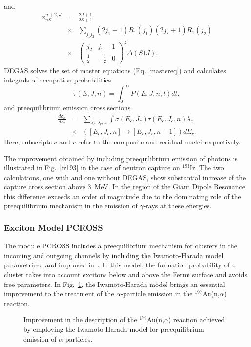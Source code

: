 \documentclass[twocolumn,amsmath,amssymb,10pt,groupedaddress,letter]{revtex4}
\begin{document}
and
\begin{eqnarray}
x_{nS}^{n+2,J}&=&\frac{2J+1}{2S+1}\nonumber\\
&\times&\sum_{j_{1}j_{2}}(2j_{1}+1)R_{1}(j_{1})(2j_{2}+1)R_{1}(j_{2})\nonumber\\
&\times&\left(\begin{array}{ccc}
j_{2} & j_{1} & 1\\
\frac{1}{2} & -\frac{1}{2} & 0\end{array}\right)^{2}\Delta(S1J).
\end{eqnarray}
DEGAS solves the set of master equations (Eq. \ref{mastereq})
and calculates integrals of occupation probabilities
\begin{equation}
\tau(E,J,n)=\int_{0}^{\infty}P(E,J,n,t)dt,
\end{equation}
and preequilibrium emission cross sections
\begin{eqnarray}
\frac{d\sigma_{x}}{d\varepsilon_{x}}&=&\sum_{J_{c},J_{r},n}\int\sigma(E_{c},J_{c})\tau(E_{c},J_{c},n)\lambda_{x}\nonumber\\
&\times&\left(\left[E_{c},J_{c},n\right]\rightarrow\left[E_{r},J_{r},n-1\right]\right)dE_{r}.
\end{eqnarray}
Here, subscripts $c$ and $r$ refer to the composite and residual
nuclei respectively.

The improvement obtained by including preequilibrium emission of photons is illustrated in Fig.~\ref{ir193} in the case of neutron capture on $^{193}$Ir. The two calculations, one with and one without DEGAS, show substantial increase of the capture cross section above 3~MeV. In the region of the Giant Dipole Resonance this difference exceeds an order of magnitude due to the dominating role of the preequilibrium mechanism in the emission of $\gamma$-rays at these energies.



\subsubsection{Exciton Model PCROSS\label{PCROSS}}
The module PCROSS includes a preequilibrium mechanism for clusters in the incoming and outgoing
channels by including the Iwamoto-Harada model~\cite{Iwamoto} parametrized and improved
in~\cite{Sato,Zhang1,Zhang2}. In this model, the formation probability of a cluster takes into
account excitons below and above the Fermi surface and avoids free parameters. In Fig.~\ref{goldna},
the Iwamoto-Harada model brings an essential improvement to the treatment of the $\alpha$-particle
 emission in the $^{197}$Au(n,$\alpha$) reaction.
\begin{figure}[htbp]
\caption{Improvement in the description of the $^{179}$Au(n,$\alpha$) reaction achieved by employing the Iwamoto-Harada model for preequilibrium emission of $\alpha$-particles.}
\label{goldna}
\end{figure}
\end{document}
